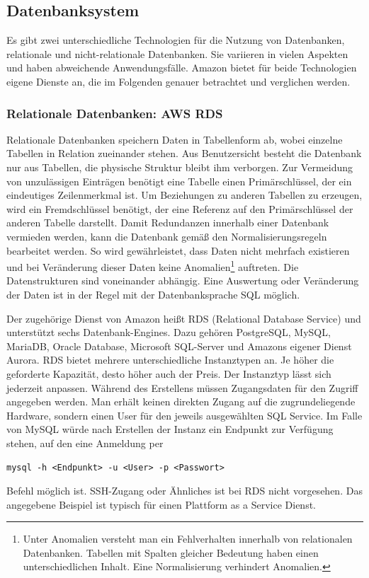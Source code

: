 \subsection{Datenbanksystem}
Es gibt zwei unterschiedliche Technologien für die Nutzung von Datenbanken, relationale und nicht-relationale Datenbanken.
Sie variieren in vielen Aspekten und haben abweichende Anwendungsfälle.
Amazon bietet für beide Technologien eigene Dienste an, die im Folgenden genauer betrachtet und verglichen werden.


\subsubsection{Relationale Datenbanken: AWS RDS}

Relationale Datenbanken speichern Daten in Tabellenform ab, wobei einzelne Tabellen in Relation zueinander stehen.
Aus Benutzersicht besteht die Datenbank nur aus Tabellen, die physische Struktur bleibt ihm verborgen.
Zur Vermeidung von unzulässigen Einträgen benötigt eine Tabelle einen Primärschlüssel, der ein eindeutiges Zeilenmerkmal ist.
Um Beziehungen zu anderen Tabellen zu erzeugen, wird ein Fremdschlüssel benötigt, der eine Referenz auf den Primärschlüssel der anderen Tabelle darstellt.
Damit Redundanzen innerhalb einer Datenbank vermieden werden, kann die Datenbank gemäß den Normalisierungsregeln bearbeitet werden.
So wird gewährleistet, dass Daten nicht mehrfach existieren und bei Veränderung dieser Daten keine Anomalien\footnote{Unter Anomalien versteht man ein Fehlverhalten innerhalb von relationalen Datenbanken. Tabellen
mit Spalten gleicher Bedeutung haben einen unterschiedlichen Inhalt. Eine Normalisierung verhindert Anomalien. } auftreten.
Die Datenstrukturen sind voneinander abhängig. Eine Auswertung oder Veränderung der Daten ist in der Regel mit der Datenbanksprache SQL möglich. \cite{Datenbankvergleich}

Der zugehörige Dienst von Amazon heißt RDS (Relational Database Service) und unterstützt sechs Datenbank-Engines. Dazu gehören
PostgreSQL, MySQL, MariaDB, Oracle Database, Microsoft SQL-Server und Amazons eigener Dienst Aurora.
RDS bietet mehrere unterschiedliche Instanztypen an.
Je höher die geforderte Kapazität, desto höher auch der Preis.
Der Instanztyp lässt sich jederzeit anpassen.
Während des Erstellens müssen Zugangsdaten für den Zugriff angegeben werden.
Man erhält keinen direkten Zugang auf die zugrundeliegende Hardware, sondern einen User für den jeweils ausgewählten SQL Service.
Im Falle von MySQL würde nach Erstellen der Instanz ein Endpunkt zur Verfügung stehen, auf den eine Anmeldung per
\begin{lstlisting}[basicstyle=\ttfamily\small, breaklines=true , frame = single, backgroundcolor=\color{flashwhite} ]
  mysql -h <Endpunkt> -u <User> -p <Passwort>
    \end{lstlisting} Befehl möglich ist. SSH-Zugang oder Ähnliches ist bei RDS nicht vorgesehen.
    Das angegebene Beispiel ist typisch für einen Plattform as a Service Dienst.

